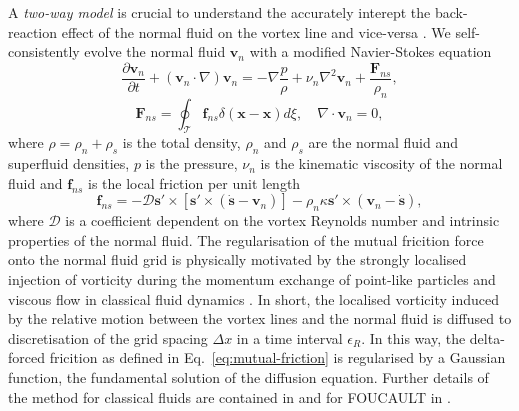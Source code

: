 \documentclass[%
superscriptaddress,
 amsmath,amssymb,
prl,
prb,
]{revtex4-2}
\def \s{\mathbf{s}}
\def \v{\mathbf{v}}
\def \x{\mathbf{x}}
\begin{document}
A \emph{two-way model} is crucial to understand the accurately interept the back-reaction effect of the normal fluid on the vortex line and vice-versa \cite{stasiakCrossComponentEnergyTransfer2024}. We self-consistently evolve the normal fluid $\v_n$ with a modified Navier-Stokes equation
\begin{equation}
	\frac{\partial \v_n}{\partial t} + (\v_n\cdot\nabla)\v_n = -\nabla\frac{p}{\rho} + \nu_n\nabla^2\v_n + \frac{\mathbf{F}_{ns}}{\rho_n},
\end{equation}
\begin{equation}
	\mathbf{F}_{ns} = \oint_{\mathcal{T}}\mathbf{f}_{ns}\delta(\x-\x)d\xi, \quad \nabla\cdot\v_n=0,
\end{equation}
where $\rho=\rho_n + \rho_s$ is the total density, $\rho_n$ and $\rho_s$ are the normal fluid and superfluid densities, $p$ is the pressure, $\nu_n$ is the kinematic viscosity of the normal fluid and $\mathbf{f}_{ns}$ is the local friction per unit length \cite{galantucciCoupledNormalFluid2015a}
\begin{equation}
	\mathbf{f}_{ns} = -\mathcal{D}\s'\times\left[\s'\times(\dot{\s}-\v_n)\right]-\rho_n\kappa\s'\times(\v_n-\dot{\s}), 
	\label{eq:mutual-friction}
\end{equation}
where $\mathcal{D}$ is a coefficient dependent on the vortex Reynolds number and intrinsic properties of the normal fluid. The regularisation of the mutual fricition force onto the normal fluid grid is physically motivated by the strongly localised injection of vorticity during the momentum exchange of point-like particles and viscous flow in classical fluid dynamics \cite{gualtieri2015exact,gualtieri2017turbulence}. In short, the localised vorticity induced by the relative motion between the vortex lines and the normal fluid is diffused to discretisation of the grid spacing $\Delta x$ in a time interval $\epsilon_R$. In this way, the delta-forced fricition as defined in Eq.~\ref{eq:mutual-friction} is regularised by a Gaussian function, the fundamental solution of the diffusion equation. Further details of the method for classical fluids are contained in \cite{gualtieri2015exact,gualtieri2017turbulence} and for FOUCAULT in \cite{galantucciNewSelfconsistentApproach2020b}.  
\end{document}
